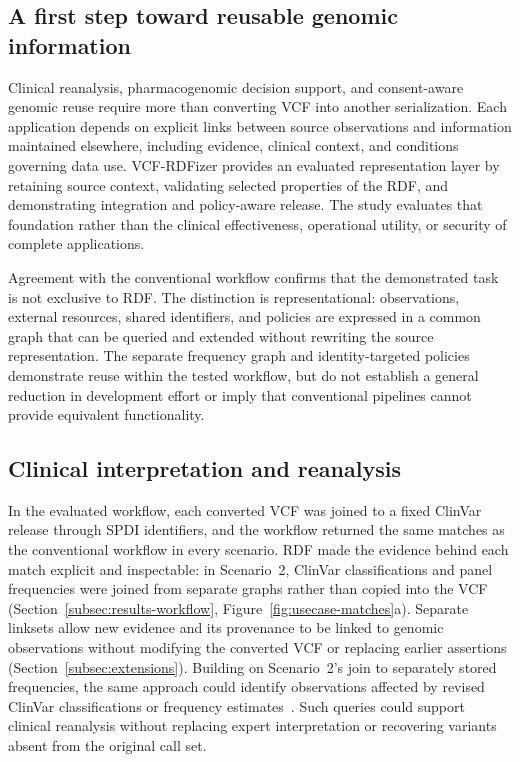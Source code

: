 \documentclass[pdflatex,sn-mathphys-num,referee]{sn-jnl}
\begin{document}
\subsection{A first step toward reusable genomic information}\label{subsec:disc-first-step}
Clinical reanalysis, pharmacogenomic decision support, and consent-aware genomic reuse require more than converting VCF into another serialization.
Each application depends on explicit links between source observations and information maintained elsewhere, including evidence, clinical context, and conditions governing data use.
VCF-RDFizer provides an evaluated representation layer by retaining source context, validating selected properties of the RDF, and demonstrating integration and policy-aware release.
The study evaluates that foundation rather than the clinical effectiveness, operational utility, or security of complete applications.

Agreement with the conventional workflow confirms that the demonstrated task is not exclusive to RDF.
The distinction is representational: observations, external resources, shared identifiers, and policies are expressed in a common graph that can be queried and extended without rewriting the source representation.
The separate frequency graph and identity-targeted policies demonstrate reuse within the tested workflow, but do not establish a general reduction in development effort or imply that conventional pipelines cannot provide equivalent functionality.

\subsection{Clinical interpretation and reanalysis}\label{subsec:disc-reanalysis}
In the evaluated workflow, each converted VCF was joined to a fixed ClinVar release through SPDI identifiers, and the workflow returned the same matches as the conventional workflow in every scenario.
RDF made the evidence behind each match explicit and inspectable: in Scenario~2, ClinVar classifications and panel frequencies were joined from separate graphs rather than copied into the VCF (Section~\ref{subsec:results-workflow}, Figure~\ref{fig:usecase-matches}a).
Separate linksets allow new evidence and its provenance to be linked to genomic observations without modifying the converted VCF or replacing earlier assertions (Section~\ref{subsec:extensions}).
Building on Scenario~2's join to separately stored frequencies, the same approach could identify observations affected by revised ClinVar classifications or frequency estimates~\cite{richards2015standards,deignan2019reevaluation}.
Such queries could support clinical reanalysis without replacing expert interpretation or recovering variants absent from the original call set.
\end{document}
